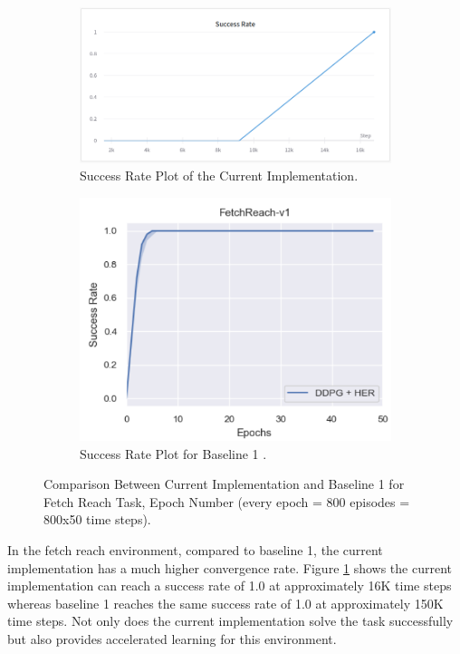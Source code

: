 \begin{figure}[h!]
     \centering
     \begin{subfigure}[b]{0.4\textwidth}
         \centering
         \includegraphics[width=\textwidth]{images/FRSR.png}
         \caption{Success Rate Plot of the Current Implementation.}
     \end{subfigure}
     \begin{subfigure}[b]{0.4\textwidth}
         \centering
         \includegraphics[width=\textwidth]{images/FRB.png}
         \caption{Success Rate Plot for Baseline 1 \cite{andrychowicz2018hindsight}.}
     \end{subfigure}
        \caption{Comparison Between Current Implementation and Baseline 1 for Fetch Reach Task, Epoch Number (every epoch = 800 episodes = 800x50 time steps).}
        \label{fig:FRR}
\end{figure}

In the fetch reach environment, compared to baseline 1, the current implementation has a much higher convergence rate. Figure \ref{fig:FRR} shows the current implementation can reach a success rate of 1.0 at approximately 16K time steps whereas baseline 1 reaches the same success rate of 1.0 at approximately 150K time steps. Not only does the current implementation solve the task successfully but also provides accelerated learning for this environment. \\

